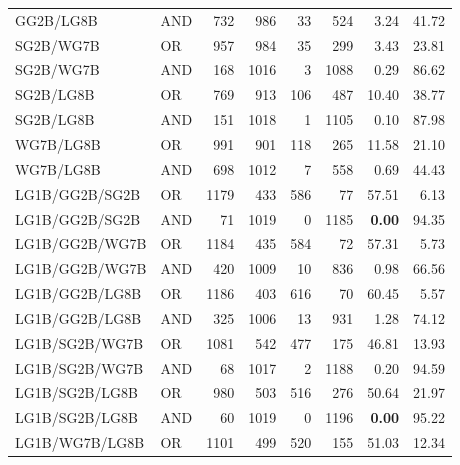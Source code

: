 \documentclass{article}
\begin{document}
{\begin{longtable}{llrrrrrr}
 GG2B/LG8B                & AND     &  732 &  986 &   33 &  524 & 3.24              & 41.72             \\
 SG2B/WG7B                & OR      &  957 &  984 &   35 &  299 & 3.43              & 23.81             \\
 SG2B/WG7B                & AND     &  168 & 1016 &    3 & 1088 & 0.29              & 86.62             \\
 SG2B/LG8B                & OR      &  769 &  913 &  106 &  487 & 10.40             & 38.77             \\
 SG2B/LG8B                & AND     &  151 & 1018 &    1 & 1105 & 0.10              & 87.98             \\
 WG7B/LG8B                & OR      &  991 &  901 &  118 &  265 & 11.58             & 21.10             \\
 WG7B/LG8B                & AND     &  698 & 1012 &    7 &  558 & 0.69              & 44.43             \\
 LG1B/GG2B/SG2B           & OR      & 1179 &  433 &  586 &   77 & 57.51             & 6.13              \\
 LG1B/GG2B/SG2B           & AND     &   71 & 1019 &    0 & 1185 & \textbf{0.00}     & 94.35             \\
 LG1B/GG2B/WG7B           & OR      & 1184 &  435 &  584 &   72 & 57.31             & 5.73              \\
 LG1B/GG2B/WG7B           & AND     &  420 & 1009 &   10 &  836 & 0.98              & 66.56             \\
 LG1B/GG2B/LG8B           & OR      & 1186 &  403 &  616 &   70 & 60.45             & 5.57              \\
 LG1B/GG2B/LG8B           & AND     &  325 & 1006 &   13 &  931 & 1.28              & 74.12             \\
 LG1B/SG2B/WG7B           & OR      & 1081 &  542 &  477 &  175 & 46.81             & 13.93             \\
 LG1B/SG2B/WG7B           & AND     &   68 & 1017 &    2 & 1188 & 0.20              & 94.59             \\
 LG1B/SG2B/LG8B           & OR      &  980 &  503 &  516 &  276 & 50.64             & 21.97             \\
 LG1B/SG2B/LG8B           & AND     &   60 & 1019 &    0 & 1196 & \textbf{0.00}     & 95.22             \\
 LG1B/WG7B/LG8B           & OR      & 1101 &  499 &  520 &  155 & 51.03             & 12.34             \\

\end{longtable}}
\end{document}
